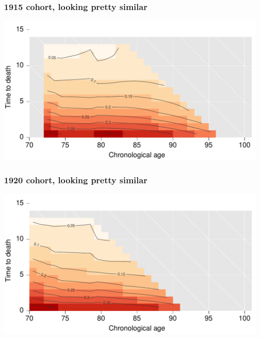 \documentclass[20pt]{beamer}
\begin{document}
\begin{frame}
\frametitle{1915 cohort, looking pretty similar}
\vspace{-4em}
\begin{center}
\includegraphics[scale=1]{Figures/srhpoor1915.pdf}
\end{center}
\end{frame}


\begin{frame}
\frametitle{1920 cohort, looking pretty similar}
\vspace{-4em}
\begin{center}
\includegraphics[scale=1]{Figures/srhpoor1920.pdf}
\end{center}
\end{frame}

\end{document}
